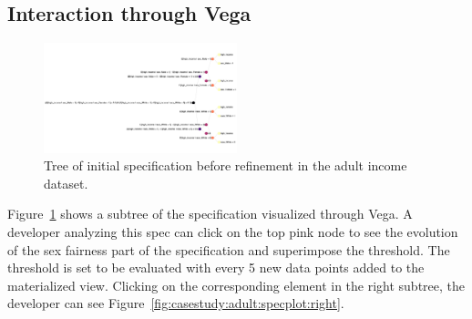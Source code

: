 \subsection{Interaction through Vega}
\label{sec:appendix:additional-case-studies:viz}
\begin{figure}[ht!]
    \centering
    \includegraphics[angle=90,width=0.5\textwidth]{avoir/images/adult-spec-tree-initial.png}
    \caption{Tree of initial specification before refinement in the adult income dataset.}
    \label{fig:casestudy:adult:initial-spec}
\end{figure}
Figure~\ref{fig:casestudy:adult:initial-spec} shows a subtree of the specification visualized through Vega.
A developer analyzing this spec can click on the top pink node to see the evolution of the sex fairness part of the specification and superimpose the threshold.
The threshold is set to be evaluated with every 5 new data points added to the materialized view.
Clicking on the corresponding element in the right subtree, the developer can see Figure~\ref{fig:casestudy:adult:specplot:right}. 


